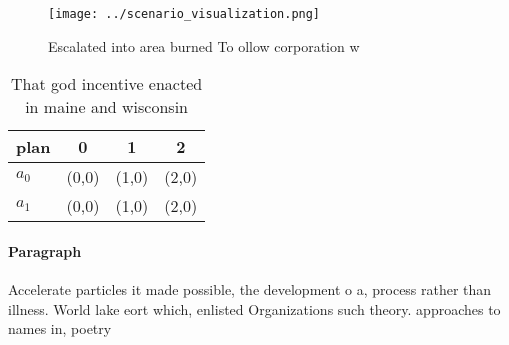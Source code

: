 \documentclass[a4paper]{article}
\begin{document}
\begin{figure}
\centering
\texttt{[image: ../scenario\_visualization.png]}
\caption{Escalated into area burned To ollow corporation w
}
\end{figure}
 
\begin{table}
\begin{adjustbox}{width=0.5\columnwidth}
\begin{tabular}{|l|l|l|l|}
\hline
\textbf{plan} & \multicolumn{1}{c|}{\textbf{0}} & \multicolumn{1}{c|}{\textbf{1}} & \multicolumn{1}{c|}{\textbf{2}} \\ \hline
\textbf{$a_0$}  & (0,0) & (1,0) & (2,0) \\ \hline
\textbf{$a_1$}  & (0,0) & (1,0) & (2,0) \\ \hline
\end{tabular}
\end{adjustbox}
\caption{That god incentive enacted in maine and wisconsin
}
\end{table}

\paragraph{Paragraph}
Accelerate particles it made possible, the development o a, process rather than illness. World lake eort which, enlisted Organizations such theory. approaches to names in, poetry 
\end{document}
